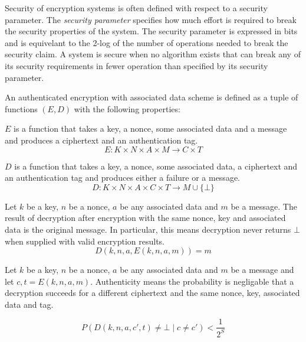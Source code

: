 Security of encryption systems is often defined with respect to a security
parameter. The \emph{security parameter} specifies how much effort is required
to break the security properties of the system. The security parameter is
expressed in bits and is equivelant to the 2-log of the number of operations
needed to break the security claim. A system is secure when no algorithm exists
that can break any of its security requirements in fewer operation than
specified by its security parameter.

An authenticated encryption with associated data scheme is defined as a tuple of
functions $(E, D)$ with the following properties:

$E$ is a function that takes a key, a nonce, some associated data and a message
and produces a ciphertext and an authentication tag.
\begin{equation}
    E \colon K \times N \times A \times M \to C \times T
\end{equation}

$D$ is a function that takes a key, a nonce, some associated data, a ciphertext
and an authentication tag and produces either a failure or a message.
\begin{equation}
    D \colon K \times N \times A \times C \times T \to M \cup \{ \bot \}
\end{equation}

Let $k$ be a key, $n$ be a nonce, $a$ be any associated data and $m$ be a
message. The result of decryption after encryption with the same nonce, key and
associated data is the original message. In particular, this means decryption
never returns $\bot$ when supplied with valid encryption results.
\begin{equation}
    D(k, n, a, E(k, n, a, m)) = m
\end{equation}


Let $k$ be a key, $n$ be a nonce, $a$ be any associated data and $m$ be a
message and let $c, t = E(k, n, a, m)$. Authenticity means the probability is
negligable that a decryption succeeds for a different ciphertext and the same
nonce, key, associated data and tag.

\begin{equation}
    P(D(k, n, a, c', t) \neq \bot \mid c \neq c') < \frac{1}{2^S}
\end{equation}

